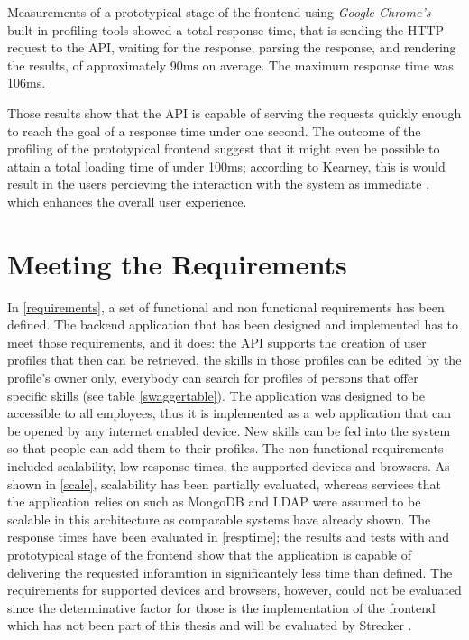 Measurements of a prototypical stage of the frontend using \textit{Google Chrome's} built-in profiling tools showed a total response time, that is sending the HTTP request to the API, waiting for the response, parsing the response, and rendering the results, of approximately 90ms on average. The maximum response time was 106ms.

Those results show that the API is capable of serving the requests quickly enough to reach the goal of a response time under one second. The outcome of the profiling of the prototypical frontend suggest that it might even be possible to attain a total loading time of under 100ms; according to Kearney, this is would result in the users percieving the interaction with the system as immediate \cite{RAIL}, which enhances the overall user experience.

\newpage

\section{Meeting the Requirements}
In \ref{requirements}, a set of functional and non functional requirements has been defined. The backend application that has been designed and implemented has to meet those requirements, and it does: the API supports the creation of user profiles that then can be retrieved, the skills in those profiles can be edited by the profile's owner only, everybody can search for profiles of persons that offer specific skills (see table \ref{swaggertable}). The application was designed to be accessible to all employees, thus it is implemented as a web application that can be opened by any internet enabled device. New skills can be fed into the system so that people can add them to their profiles. \newline
The non functional requirements included scalability, low response times, the supported devices and browsers.
As shown in \ref{scale}, scalability has been partially evaluated, whereas services that the application relies on such as MongoDB and LDAP were assumed to be scalable in this architecture as comparable systems have already shown. The response times have been evaluated in \ref{resptime}; the results and tests with and prototypical stage of the frontend show that the application is capable of delivering the requested inforamtion in significantely less time than defined.
The requirements for supported devices and browsers, however, could not be evaluated since the determinative factor for those is the implementation of the frontend which has not been part of this thesis and will be evaluated by Strecker \cite{strecker}.
